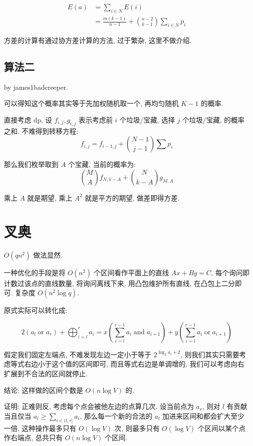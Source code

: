 \documentclass[a4paper, 12pt]{ctexart}
\begin{document}
\begin{align}
    E(a) &= \sum_{i \in N} E(i)\\
    &= \frac{m(k - 1)}{n - 1} + \binom{n - 2}{k - 1}\sum_{i \in N} p_i
\end{align}

方差的计算有通过协方差计算的方法, 过于繁杂, 这里不做介绍.

\subsection{算法二}

by james1badcreeper.

可以得知这个概率其实等于先加权随机取一个, 再均匀随机 $K - 1$ 的概率.

直接考虑 dp, 设 $f_{i,j}, g_{i, j}$ 表示考虑前 $i$ 个垃圾/宝藏, 选择 $j$ 个垃圾/宝藏, 的概率之和.
不难得到转移方程:
$$
f_{i, j} = f_{i - 1, j} + \binom{N - 1}{j - 1}\sum p_i
$$

那么我们枚举取到 $A$ 个宝藏, 当前的概率为:
$$
\binom{M}{A} f_{N, k - A} + \binom{N}{k - A} g_{M, A}
$$

乘上 $A$ 就是期望, 乘上 $A^2$ 就是平方的期望, 做差即得方差.

\section{叉奥}

$O(qn^2)$ 做法显然.

一种优化的手段是将 $O(n ^ 2)$ 个区间看作平面上的直线 $Ax + By = C$, 每个询问即计数过该点的直线数量, 将询问离线下来, 用凸包维护所有直线, 在凸包上二分即可.
复杂度 $O(n^2 \log q)$.

原式实际可以转化成:

$$
2(a_l\operatorname{or}a_r)+\bigoplus_{i=l}^ra_i=x(\sum_{i=l}^{r-1}a_i\operatorname{and}a_{i+1})+y(\sum_{i=l}^{r-1}a_i\operatorname{or}a_{i+1})
$$

假定我们固定左端点, 不难发现左边一定小于等于 $2^{\log_2 a_i + 2}$, 则我们其实只需要考虑等式右边小于这个值的区间即可, 而且等式右边是单调增的, 我们可以考虑向右扩展到不合法的区间就停止.

结论: 这样做的区间个数是 $O(n \log V)$ 的.

证明: 正难则反, 考虑每个点会被他左边的点算几次. 设当前点为 $a_r$, 则对 $l$ 有贡献当且仅当 $a_l \ge \sum_{i \in (l, r]}a_i$, 那么每一个新的合法的 $a_l$ 加进来区间和都会扩大至少一倍, 这种操作最多只有 $O(\log V)$ 次, 则最多只有 $O(\log V)$ 个区间以某个点作右端点, 总共只有 $O(n \log V)$ 个区间.
\end{document}
